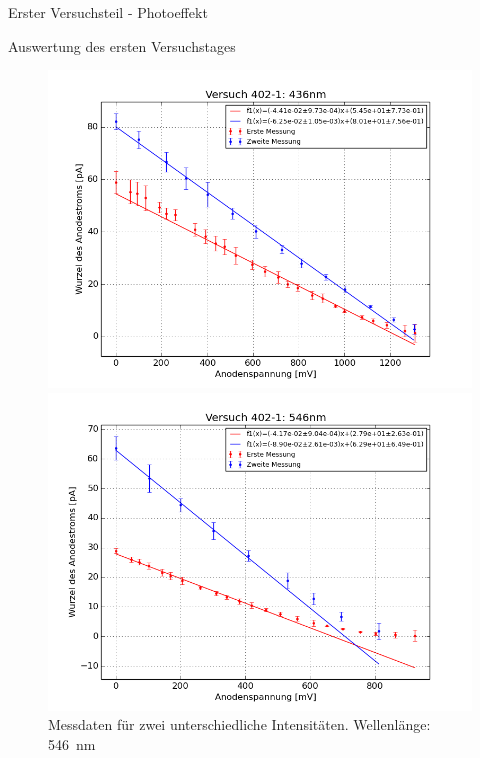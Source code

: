 \documentclass[pdftex, a4paper,11pt, twoside, ngerman]{report}
\begin{document}
\begin{chapter}{Erster Versuchsteil - Photoeffekt}
\begin{section}{Auswertung des ersten Versuchstages}
\begin{figure}[htbp]
\begin{minipage}{0.48\textwidth}
          \includegraphics[width=\textwidth]{Figures/Versuch402_1_436.png}
          \caption{Messdaten für zwei unterschiedliche Intensitäten.
              Wellenlänge: \SI{436}{\nano\meter}}
          \label{fig:Versuch402_1_436}
        \end{minipage}
        \begin{minipage}{0.48\textwidth}
          \centering
          \includegraphics[width=\textwidth]{Figures/Versuch402_1_546.png}
          \caption{Messdaten für zwei unterschiedliche Intensitäten.
              Wellenlänge: \SI{546}{\nano\meter}}
          \label{fig:Versuch402_1_546}
        \end{minipage}\quad
        \begin{minipage}{0.48\textwidth}

\end{minipage}
\end{figure}
\end{section}
\end{chapter}
\end{document}
